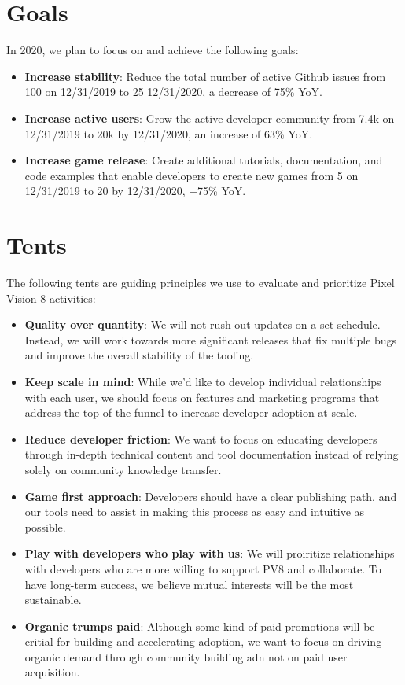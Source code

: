 \documentclass{sixpage}
\begin{document}
    \section{Goals}
    In 2020, we plan to focus on and achieve the following goals:
    \begin{itemize}
        \item \textbf{Increase stability}: Reduce the total number of active Github issues from 100 on 12/31/2019 to 25 12/31/2020, a decrease of 75\% YoY.
        \item \textbf{Increase active users}: Grow the active developer community from 7.4k on 12/31/2019 to 20k by 12/31/2020, an increase of 63\% YoY.
        \item \textbf{Increase game release}: Create additional tutorials, documentation, and code examples that enable developers to create new games from 5 on 12/31/2019 to 20 by 12/31/2020, +75\% YoY.
    \end{itemize}


    \section{Tents}
    The following tents are guiding principles we use to evaluate and prioritize Pixel Vision 8 activities:
    \begin{itemize}
        \item \textbf{Quality over quantity}: We will not rush out updates on a set schedule. Instead, we will work towards more significant releases that fix multiple bugs and improve the overall stability of the tooling.
        \item \textbf{Keep scale in mind}: While we'd like to develop individual relationships with each user, we should focus on features and marketing programs that address the top of the funnel to increase developer adoption at scale.
        \item \textbf{Reduce developer friction}: We want to focus on educating developers through in-depth technical content and tool documentation instead of relying solely on community knowledge transfer.
        \item \textbf{Game first approach}: Developers should have a clear publishing path, and our tools need to assist in making this process as easy and intuitive as possible.
        \item \textbf{Play with developers who play with us}: We will proiritize relationships with developers who are more willing to support PV8 and collaborate. To have long-term success, we believe mutual interests will be the most sustainable.
        \item \textbf{Organic trumps paid}: Although some kind of paid promotions will be critial for building and accelerating adoption, we want to focus on driving organic demand through community building adn not on paid user acquisition.
    \end{itemize}
\end{document}
